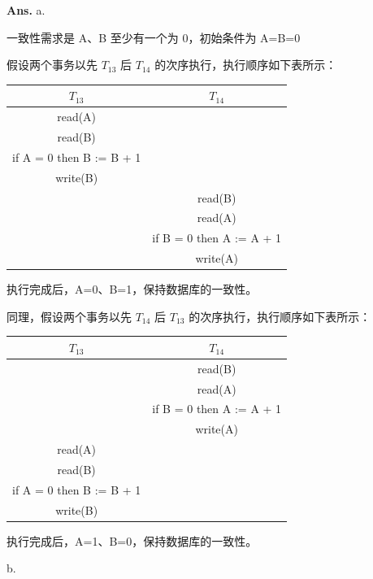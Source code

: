 \documentclass[12pt, a4paper, UTF8, fontset=windows]{ctexbook}
\newenvironment{solution}{\par\noindent\textbf{Ans.}}{\par}
\begin{document}
\begin{solution}
a. 

一致性需求是 A、B 至少有一个为 0，初始条件为 A=B=0

假设两个事务以先 $T_{13}$ 后 $T_{14}$ 的次序执行，执行顺序如下表所示：

\begin{table}[h]
    \centering
    \begin{tabular}{|c|c|} \hline
        $T_{13}$ & $T_{14}$  \\ \hline
        read(A) &  \\ \hline
        read(B) &  \\ \hline
        if A = 0 then B := B + 1 &  \\ \hline
        write(B) &  \\ \hline
        & read(B) \\ \hline
        & read(A) \\ \hline
        & if B = 0 then A := A + 1 \\ \hline
        & write(A) \\ \hline
    \end{tabular}
\end{table}

执行完成后，A=0、B=1，保持数据库的一致性。

\newpage

同理，假设两个事务以先 $T_{14}$ 后 $T_{13}$ 的次序执行，执行顺序如下表所示：

\begin{table}[h]
    \centering
    \begin{tabular}{|c|c|} \hline
        $T_{13}$ & $T_{14}$  \\ \hline
        & read(B) \\ \hline
        & read(A) \\ \hline
        & if B = 0 then A := A + 1 \\ \hline
        & write(A) \\ \hline
        read(A) &  \\ \hline
        read(B) &  \\ \hline
        if A = 0 then B := B + 1 &  \\ \hline
        write(B) &  \\ \hline
    \end{tabular}
\end{table}

执行完成后，A=1、B=0，保持数据库的一致性。

b. 


\end{solution}
\end{document}
